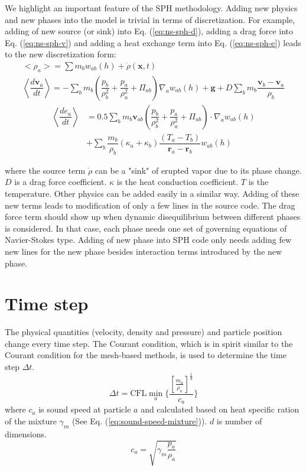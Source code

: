 We highlight an important feature of the SPH methodology. Adding new physics and new phases into the model is trivial in terms of discretization. For example, adding of new source (or sink) into Eq. (\ref{eq:ns-sph-d}), adding a drag force into Eq. (\ref{eq:ns-sph-v})  and adding a heat exchange term into Eq. (\ref{eq:ns-sph-e}) leads to the new discretization form:
\begin{align}
<\rho_a> = \sum m_b w_{ab} \left(h\right) + \dot{\rho}\left(\textbf{x},t\right)\label{eq:ns-source-sph-d} \\
\left\langle\dfrac{d \textbf{v}_a}{d t}\right\rangle= -\sum_b m_b \left(\dfrac{p_b}{\rho_b^2} + \dfrac{p_a}{\rho_a^2} + \Pi_{ab}\right) \nabla_a w_{a b}\left(h\right) +\textbf{g} + D \sum	_b m_b \dfrac{\textbf{v}_b - \textbf{v}_a}{\rho_b} \label{eq:ns-drag-sph-v}
\end{align}
\begin{equation}
\begin{split}
\left\langle\dfrac{d e_a}{d t}\right\rangle
&= 0.5\sum_b m_b \textbf{v}_{a b}\left(\dfrac{p_b}{\rho_b^2} + \dfrac{p_a}{\rho_a^2} + \Pi_{ab}\right) \cdot \nabla_a w_{a b}\left(h\right) \\
&+ \sum_b \dfrac{m_b}{\rho_b}\left(\kappa_a + \kappa_b\right) \dfrac{\left(T_a - T_b\right)}{\textbf{r}_a - \textbf{r}_b} w_{ab}\left(h\right) \label{eq:ns-conduction-sph-e}
\end{split}
\end{equation}

where the source term $\dot{\rho}$ can be a "sink" of erupted vapor due to its phase change.
$D$ is a drag force coefficient. $\kappa$ is the heat conduction coefficient. $T$ is the temperature. Other physics can be added easily in a similar way. Adding of these new terms leads to modification of only a few lines in the source code. The drag force term should show up when dynamic disequilibrium between different phases is considered. In that case, each phase needs one set of governing equations of Navier-Stokes type. Adding of new phase into SPH code only needs adding few new lines for the new phase besides interaction terms introduced by the new phase.

\section{Time step}
The physical quantities (velocity, density and pressure) and particle position change every time step. The Courant condition, which is in spirit similar to the Courant condition for the mesh-based methods, is used to determine the time step $\Delta t$.
\begin{equation}
\Delta t = \textrm{CFL} \min_a \bigg \lbrace \dfrac{\left[\frac{m_a}{\rho_a}\right]^{\frac{1}{d}}}{c_a} \bigg \rbrace
\end{equation}
where $c_a$ is sound speed at particle $a$ and calculated based on heat specific ration of the mixture $\gamma_m$ (See Eq. (\ref{eq:sound-speed-mixture})). 
$d$ is number of dimensions. 
\begin{equation}
c_a = \sqrt{\gamma_m \frac{p_a}{\rho_a}}
\label{eq:sound-speed-mixture}
\end{equation}

